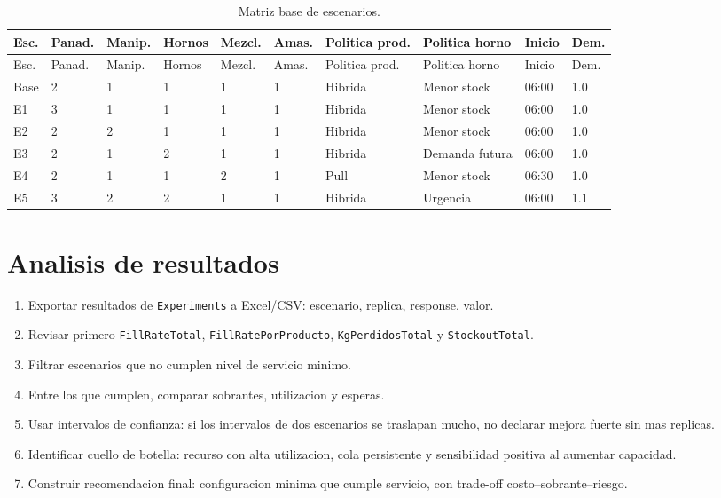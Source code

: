 \documentclass[11pt]{article}
\newcommand{\simio}[1]{\texttt{#1}}
\newcommand{\resp}[1]{\texttt{#1}}
\begin{document}
{\tiny
\setlength{\tabcolsep}{2pt}
\begin{longtable}{@{}C{0.8cm}C{1.05cm}C{1.05cm}C{0.9cm}C{1.05cm}C{1.05cm}L{1.65cm}L{1.65cm}C{1.05cm}C{0.8cm}@{}}
\caption{Matriz base de escenarios.}\\
\toprule
{}
\color{white}Esc. & \color{white}Panad. & \color{white}Manip. & \color{white}Hornos & \color{white}Mezcl. & \color{white}Amas. & \color{white}Politica prod. & \color{white}Politica horno & \color{white}Inicio & \color{white}Dem. \\
\midrule
\endfirsthead
\toprule
{}
\color{white}Esc. & \color{white}Panad. & \color{white}Manip. & \color{white}Hornos & \color{white}Mezcl. & \color{white}Amas. & \color{white}Politica prod. & \color{white}Politica horno & \color{white}Inicio & \color{white}Dem. \\
\midrule
\endhead
Base & 2 & 1 & 1 & 1 & 1 & Hibrida & Menor stock & 06:00 & 1.0 \\
E1 & 3 & 1 & 1 & 1 & 1 & Hibrida & Menor stock & 06:00 & 1.0 \\
E2 & 2 & 2 & 1 & 1 & 1 & Hibrida & Menor stock & 06:00 & 1.0 \\
E3 & 2 & 1 & 2 & 1 & 1 & Hibrida & Demanda futura & 06:00 & 1.0 \\
E4 & 2 & 1 & 1 & 2 & 1 & Pull & Menor stock & 06:30 & 1.0 \\
E5 & 3 & 2 & 2 & 1 & 1 & Hibrida & Urgencia & 06:00 & 1.1 \\
\bottomrule
\end{longtable}
}

\section{Analisis de resultados}

\begin{enumerate}
  \item Exportar resultados de \simio{Experiments} a Excel/CSV: escenario, replica, response, valor.
  \item Revisar primero \resp{FillRateTotal}, \resp{FillRatePorProducto}, \resp{KgPerdidosTotal} y \resp{StockoutTotal}.
  \item Filtrar escenarios que no cumplen nivel de servicio minimo.
  \item Entre los que cumplen, comparar sobrantes, utilizacion y esperas.
  \item Usar intervalos de confianza: si los intervalos de dos escenarios se traslapan mucho, no declarar mejora fuerte sin mas replicas.
  \item Identificar cuello de botella: recurso con alta utilizacion, cola persistente y sensibilidad positiva al aumentar capacidad.
  \item Construir recomendacion final: configuracion minima que cumple servicio, con trade-off costo--sobrante--riesgo.
\end{enumerate}
\end{document}
